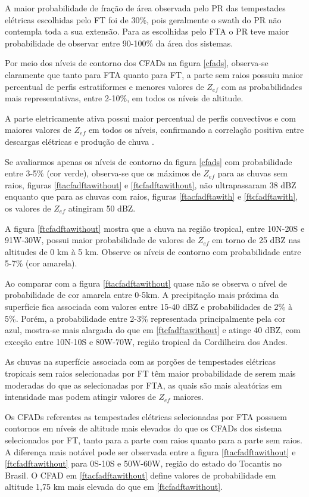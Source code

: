 A maior probabilidade de fração de área observada pelo PR das tempestades elétricas escolhidas pelo FT foi de 30\%, pois geralmente o swath do PR não contempla toda a sua extensão. Para as escolhidas pelo FTA o PR teve maior probabilidade de observar entre 90-100\% da área dos sistemas.

Por meio dos níveis de contorno dos CFADs na figura \ref{cfads}, observa-se claramente que tanto para FTA quanto para FT, a parte sem raios possuiu maior percentual de perfis estratiformes e menores valores de $Z_{ef}$ com as  probabilidades mais representativas, entre 2-10\%, em todos os níveis de altitude.

A parte eletricamente ativa possui maior percentual de perfis convectivos e com maiores valores de $Z_{ef}$ em todos os níveis, confirmando a correlação positiva entre descargas elétricas e produção de chuva \cite{Petersen1998}.

Se avaliarmos apenas os níveis de contorno da figura \ref{cfads} com probabilidade entre 3-5\% (cor verde), observa-se que os máximos de $Z_{ef}$ para as chuvas sem raios, figuras \ref{ftacfadftawithout} e \ref{ftcfadftawithout}, não ultrapassaram 38 dBZ enquanto que para as chuvas com raios, figuras \ref{ftacfadftawith} e \ref{ftcfadftawith}, os valores de $Z_{ef}$ atingiram 50 dBZ.

A figura \ref{ftcfadftawithout} mostra que a chuva na região tropical, entre 10N-20S e 91W-30W, possui maior probabilidade de valores de $Z_{ef}$ em torno de 25 dBZ nas altitudes de  0 km à 5 km. Observe os níveis de contorno com probabilidade entre 5-7\% (cor amarela).

Ao comparar com a figura \ref{ftacfadftawithout} quase não se observa o nível de probabilidade de cor amarela entre 0-5km. A precipitação mais próxima da superfície fica associada com valores entre 15-40 dBZ e probabilidades de 2\% à 5\%. Porém, a probabilidade entre 2-3\% representada principalmente pela cor azul, mostra-se mais alargada do que em \ref{ftcfadftawithout} e atinge 40 dBZ, com exceção entre 10N-10S e 80W-70W, região tropical da Cordilheira dos Andes.

As chuvas na superfície associada com as porções de tempestades elétricas tropicais sem raios selecionadas por FT têm maior probabilidade de serem mais moderadas do que as selecionadas por FTA, as quais são mais aleatórias em intensidade mas podem atingir valores de $Z_{ef}$ maiores.

Os CFADs referentes as tempestades elétricas selecionadas por FTA possuem contornos em níveis de altitude mais elevados do que os CFADs dos sistema selecionados por FT, tanto para a parte com raios quanto para a parte sem raios. A diferença mais notável pode ser observada entre a figura \ref{ftacfadftawithout} e \ref{ftcfadftawithout} para 0S-10S e 50W-60W, região do estado do Tocantis no Brasil. O CFAD em \ref{ftacfadftawithout} define valores de probabilidade em altitude 1,75 km mais elevada do que em \ref{ftcfadftawithout}.


